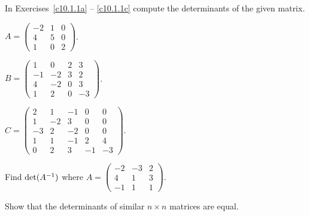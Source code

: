 \noindent  In Exercises~\ref{c10.1.1a} -- \ref{c10.1.1c} compute the 
determinants of the given matrix.
\begin{exercise} \label{c10.1.1a}
$A = \left(\begin{array}{rrr} -2 & 1 & 0 \\ 4 & 5& 0 \\ 1 & 0 & 2
\end{array} \right)$.
\end{exercise} 
\begin{exercise} \label{c10.1.1b}
$B = \left(\begin{array}{rrrr} 1 & 0 & 2 & 3 \\ -1 & -2 & 3 & 2
\\ 4 & -2 & 0 & 3 \\ 1 & 2 & 0 & -3 \end{array} \right)$.
\end{exercise}
\begin{exercise} \label{c10.1.1c}
$C = \left(\begin{array}{rrrrr} 2 & 1 & -1 & 0 & 0 \\ 1 & -2 & 3
& 0 & 0 \\ -3 & 2 & -2 & 0 & 0 \\ 1 & 1 & -1 & 2 & 4 \\ 0 & 2 &
3 & -1 & -3 \end{array} \right)$.
\end{exercise}

\begin{exercise} \label{c10.1.2}
Find $\det(A^{-1})$ where 
$A = \left(\begin{array}{rrr} -2 & -3 & 2 \\ 4 & 1 & 3 \\ -1 & 1 & 1
\end{array} \right)$. 
\end{exercise}

\begin{exercise} \label{c10.1.3}
Show that the determinants of similar $n\times n$ matrices are
equal. 
\end{exercise}

